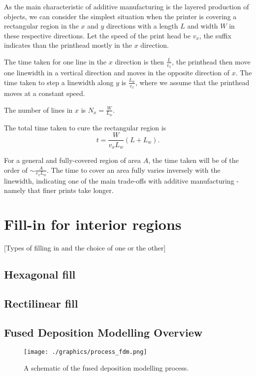 As the main characteristic of additive manufacturing is the layered production of objects, we can consider the simplest situation when the printer is covering a rectangular region in the $x$ and $y$ directions with a length $L$ and width $W$ in these respective directions. Let the speed of the print head be $v_{x}$, the suffix indicates than the printhead mostly in the $x$ direction. 

The time taken for one line in the $x$ direction is then $\frac{L}{v_{x}}$, the printhead then move one linewidth in a vertical direction and moves in the opposite direction of $x$. The time taken to step a linewidth along $y$ is $\frac{L_{w}}{v_{x}}$, where we assume that the printhead moves at a constant speed. 

The number of lines in $x$ is $N_{x} = \frac{W}{L_{w}}$. 

The total time taken to cure the rectangular region is 
\begin{equation}
  t = \frac{W}{v_{x} L_{w}} \left( L + L_{w} \right). 
\end{equation}

For a general and fully-covered region of area $A$, the time taken will be of the order of $\sim \frac{A}{v_{x} L_{w}}$. The time to cover an area fully varies inversely with the linewidth, indicating one of the main trade-offs with additive manufacturing - namely that finer prints take longer. 

\section{Fill-in for interior regions}

[Types of filling in and the choice of one or the other]

\subsection{Hexagonal fill}

\subsection{Rectilinear fill}

\subsection{Fused Deposition Modelling Overview}


\begin{center} 
\begin{figure}[h!!]
 \centering
 \texttt{[image: ./graphics/process\_fdm.png]}
 \caption{A schematic of the fused deposition modelling process.}
\end{figure}
\end{center}

